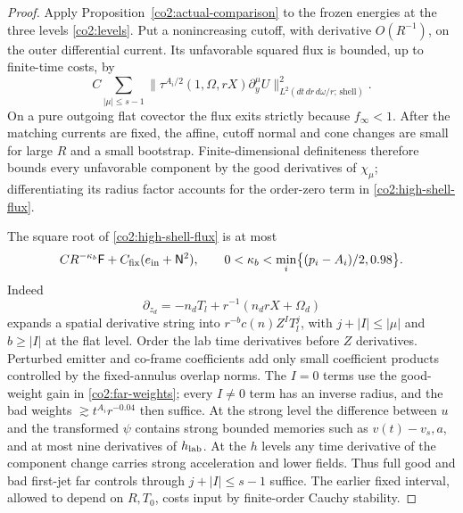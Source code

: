 \begin{proof}
Apply Proposition~\ref{co2:actual-comparison} to the frozen energies at the
three levels \eqref{co2:levels}.  Put a nonincreasing cutoff, with derivative
$O(R^{-1})$, on the outer differential current. Its unfavorable squared
flux is bounded, up to finite-time costs, by
\begin{equation}\label{co2:high-shell-flux}
 C\sum_{|\mu|\le s-1}
 \|\tau^{A_i/2}(1,\Omega,rX)\partial_y^\mu U
         \|^2_{L^2(dt\,dr\,d\omega/r;\,\mathrm{shell})}.
\end{equation}
On a pure outgoing flat covector the flux exits strictly because
$f_\infty<1$.  After the matching currents are fixed, the affine, cutoff
normal and cone changes are small for large $R$ and a small bootstrap.
Finite-dimensional definiteness therefore bounds every unfavorable component
by the good derivatives of $\chi_\mu$; differentiating its radius factor
accounts for the order-zero term in \eqref{co2:high-shell-flux}.

The square root of \eqref{co2:high-shell-flux} is at most
\begin{equation}\label{co2:high-shell-bound}
 C R^{-\kappa_b}\mathsf F+C_{\rm fix}(e_{\rm in}+\mathsf N^2),
 \qquad
 0<\kappa_b<\min_i\bigl\{(p_i-A_i)/2,0.98\bigr\}.
\end{equation}
Indeed
\[
 \partial_{z_d}=-n_dT_l+r^{-1}(n_drX+\Omega_d)
\]
expands a spatial derivative string into
$r^{-b}c(n)Z^IT_l^j$, with $j+|I|\le|\mu|$ and $b\ge|I|$ at the flat
level.  Order the lab time derivatives before $Z$ derivatives.  Perturbed
emitter and co-frame coefficients add only small coefficient products
controlled by the fixed-annulus overlap norms.  The $I=0$ terms use the
good-weight gain in \eqref{co2:far-weights}; every $I\ne0$ term has an
inverse radius, and the bad weights
$\gtrsim t^{A_i}r^{-0.04}$ then suffice.  At the strong level the difference
between $u$ and the transformed $\psi$ contains strong bounded memories
such as $v(t)-v_s,a$, and at most nine derivatives of $h_{\rm lab}$.
At the $h$ levels any time derivative of the component change carries strong
acceleration and lower fields.  Thus full good and bad first-jet far controls
through $j+|I|\le s-1$ suffice.  The earlier fixed interval, allowed to
depend on $R,T_0$, costs input by finite-order Cauchy stability.


\end{proof}
